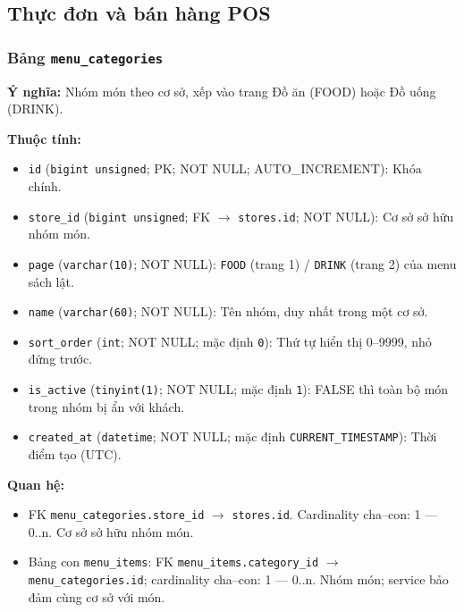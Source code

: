 \subsection{Thực đơn và bán hàng POS}

\subsubsection{Bảng \texttt{menu\_categories}}

\textbf{Ý nghĩa:} Nhóm món theo cơ sở, xếp vào trang Đồ ăn (FOOD) hoặc Đồ uống (DRINK).\par

\textbf{Thuộc tính:}

\begin{itemize}

\item \texttt{id} (\texttt{bigint unsigned}; PK; NOT NULL; AUTO_INCREMENT): Khóa chính.

\item \texttt{store\_id} (\texttt{bigint unsigned}; FK $\rightarrow$ \texttt{stores.id}; NOT NULL): Cơ sở sở hữu nhóm món.

\item \texttt{page} (\texttt{varchar(10)}; NOT NULL): \texttt{FOOD} (trang 1) / \texttt{DRINK} (trang 2) của menu sách lật.

\item \texttt{name} (\texttt{varchar(60)}; NOT NULL): Tên nhóm, duy nhất trong một cơ sở.

\item \texttt{sort\_order} (\texttt{int}; NOT NULL; mặc định \texttt{0}): Thứ tự hiển thị 0–9999, nhỏ đứng trước.

\item \texttt{is\_active} (\texttt{tinyint(1)}; NOT NULL; mặc định \texttt{1}): FALSE thì toàn bộ món trong nhóm bị ẩn với khách.

\item \texttt{created\_at} (\texttt{datetime}; NOT NULL; mặc định \texttt{CURRENT\_TIMESTAMP}): Thời điểm tạo (UTC).

\end{itemize}

\textbf{Quan hệ:}

\begin{itemize}

\item FK \texttt{menu\_categories.store\_id} $\rightarrow$ \texttt{stores.id}. Cardinality cha--con: 1 — 0..n. Cơ sở sở hữu nhóm món.

\item Bảng con \texttt{menu\_items}: FK \texttt{menu\_items.category\_id} $\rightarrow$ \texttt{menu\_categories.id}; cardinality cha--con: 1 — 0..n. Nhóm món; service bảo đảm cùng cơ sở với món.

\end{itemize}

